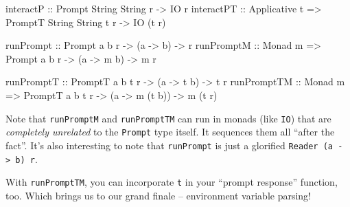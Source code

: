 \documentclass[]{article}
\newenvironment{Shaded}{}{}
\newcommand{\DataTypeTok}[1]{\textcolor[rgb]{0.56,0.13,0.00}{{#1}}}
\newcommand{\OtherTok}[1]{\textcolor[rgb]{0.00,0.44,0.13}{{#1}}}
\newcommand{\NormalTok}[1]{{#1}}
\begin{document}
\begin{Shaded}
\begin{Highlighting}[]
\OtherTok{interactP   ::}                  \DataTypeTok{Prompt}  \DataTypeTok{String} \DataTypeTok{String}   \NormalTok{r }\OtherTok{->} \DataTypeTok{IO} \NormalTok{r}
\OtherTok{interactPT  ::} \DataTypeTok{Applicative} \NormalTok{t }\OtherTok{=>} \DataTypeTok{PromptT} \DataTypeTok{String} \DataTypeTok{String} \NormalTok{t r }\OtherTok{->} \DataTypeTok{IO} \NormalTok{(t r)}

\OtherTok{runPrompt   ::}                  \DataTypeTok{Prompt}  \NormalTok{a b   r }\OtherTok{->} \NormalTok{(a }\OtherTok{->}   \NormalTok{b) }\OtherTok{->} \NormalTok{r}
\OtherTok{runPromptM  ::} \DataTypeTok{Monad} \NormalTok{m       }\OtherTok{=>} \DataTypeTok{Prompt}  \NormalTok{a b   r }\OtherTok{->} \NormalTok{(a }\OtherTok{->} \NormalTok{m b) }\OtherTok{->} \NormalTok{m r}

\OtherTok{runPromptT  ::}                  \DataTypeTok{PromptT} \NormalTok{a b t r }\OtherTok{->} \NormalTok{(a }\OtherTok{->}    \NormalTok{t b)  }\OtherTok{->} \NormalTok{t r}
\OtherTok{runPromptTM ::} \DataTypeTok{Monad} \NormalTok{m       }\OtherTok{=>} \DataTypeTok{PromptT} \NormalTok{a b t r }\OtherTok{->} \NormalTok{(a }\OtherTok{->} \NormalTok{m (t b)) }\OtherTok{->} \NormalTok{m (t r)}
\end{Highlighting}
\end{Shaded}

Note that \texttt{runPromptM} and \texttt{runPromptTM} can run in monads (like
\texttt{IO}) that are \emph{completely unrelated} to the \texttt{Prompt} type
itself. It sequences them all ``after the fact''. It's also interesting to note
that \texttt{runPrompt} is just a glorified
\texttt{Reader\ (a\ -\textgreater{}\ b)\ r}.

With \texttt{runPromptTM}, you can incorporate \texttt{t} in your ``prompt
response'' function, too. Which brings us to our grand finale -- environment
variable parsing!
\end{document}

